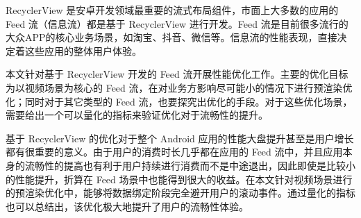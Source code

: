 RecyclerView 是安卓开发领域最重要的流式布局组件，市面上大多数的应用的 Feed 流（信息流）都是基于 RecyclerView 进行开发。Feed 流是目前很多流行的大众APP的核心业务场景，如淘宝、抖音、微信等。信息流的性能表现，直接决定着这些应用的整体用户体验。

本文针对基于 RecyclerView 开发的 Feed 流开展性能优化工作。主要的优化目标为以视频场景为核心的 Feed 流，在对业务方影响尽可能小的情况下进行预渲染优化；同时对于其它类型的 Feed 流，也要探究出优化的手段。对于这些优化场景，需要给出一个可以量化的指标来验证优化对于流畅性的提升。

基于 RecyclerView 的优化对于整个 Android 应用的性能大盘提升甚至是用户增长都有很重要的意义。由于用户的消费时长几乎都在应用的 Feed 流中，并且应用本身的流畅性的提高也有利于用户持续进行消费而不是中途退出，因此即使是比较小的性能提升，折算在 Feed 场景中也能得到很大的收益。在本文针对视频场景进行的预渲染优化中，能够将数据绑定阶段完全避开用户的滚动事件。通过量化的指标也可以总结出，该优化极大地提升了用户的流畅性体验。





